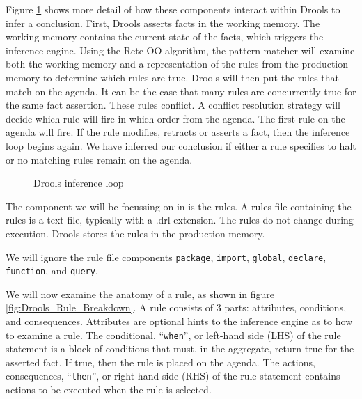 Figure \ref{fig:Drools_inference_loop} shows more detail of how these components interact within Drools to infer a conclusion.
First, Drools asserts facts in the working memory.
The working memory contains the current state of the facts, which triggers the inference engine.
Using the Rete-OO algorithm, the pattern matcher will examine both the working memory and a representation of the rules from the production memory to determine which rules are true.
Drools will then put the rules that match on the agenda.
It can be the case that many rules are concurrently true for the same fact assertion.
These rules conflict.
A conflict resolution strategy will decide which rule will fire in which order from the agenda.
The first rule on the agenda will fire.
If the rule modifies, retracts or asserts a fact, then the inference loop begins again.
We have inferred our conclusion if either a rule specifies to halt or no matching rules remain on the agenda.

\begin{figure}
    \centering
    \caption{Drools inference loop}
    \label{fig:Drools_inference_loop}
\end{figure}

The component we will be focussing on in is the rules.
A rules file containing the rules is a text file, typically with a .drl extension.
The rules do not change during execution.
Drools stores the rules in the production memory.

We will ignore the rule file components \texttt{package}, \texttt{import}, \texttt{global}, \texttt{declare}, \texttt{function}, and \texttt{query}.

We will now examine the anatomy of a rule, as shown in figure \ref{fig:Drools_Rule_Breakdown}.
A rule consists of 3 parts: attributes, conditions, and consequences.
Attributes are optional hints to the inference engine as to how to examine a rule.
The conditional, ``\texttt{when}'', or left-hand side (LHS) of the rule statement is a block of conditions that must, in the aggregate, return true for the asserted fact. 
If true, then the rule is placed on the agenda.
The actions, consequences, ``\texttt{then}'', or right-hand side (RHS) of the rule statement contains actions to be executed when the rule is selected.

